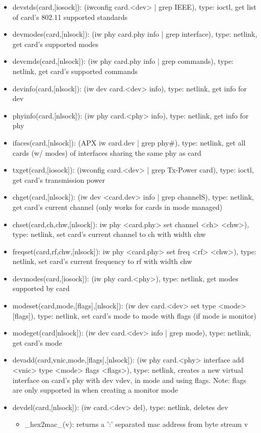 \documentclass[11pt]{article}
\begin{document}
\begin{appendices}
\begin{itemize}
\item devstds(card,[iosock]): (iwconfig card.<dev> | grep IEEE), type: ioctl, get
list of card's 802.11 supported standards
\item devmodes(card,[nlsock]): (iw phy card.phy info | grep interface), type:
netlink, get card's supported modes
\item devcmds(card,[nlsock]): (iw phy card.phy info | grep commands), type:
netlink, get card's supported commands
\item devinfo(card,[nlsock]): (iw dev card.<dev> info), type: netlink, get info 
for dev 
\item phyinfo(card,[nlsock]): (iw phy card.<phy> info), type: netlink, get info
for phy
\item ifaces(card,[nlsock]): (APX iw card.dev | grep phy\#), type: netlink, get all
cards (w/ modes) of interfaces sharing the same phy as card
\item txget(card,[iosock]): (iwconfig card.<dev> | grep Tx-Power card), type: 
ioctl, get card's transmission power
\item chget(card,[nlsock]): (iw dev <card.dev> info | grep channelS), type: 
netlink, get card's current channel (only works for cards in mode managed)
\item chset(card,ch,chw,[nlsock]): iw phy <card.phy> set channel <ch> <chw>), 
type: netlink, set card's current channel to ch with width chw
\item freqset(card,rf,chw,[nlsock]): iw phy <card.phy> set freq <rf> <chw>), 
type: netlink, set card's current frequency to rf with width chw
\item devmodes(card,[iosock]): (iw phy card.<phy>), type: netlink, get modes 
supported by card
\item modeset(card,mode,[flags],[nlsock]): (iw dev card.<dev> set type <mode> 
[flags]), type: netlink, set card's mode to mode with flags (if mode is monitor)
\item modeget(card[nlsock]): (iw dev card.<dev> info | grep mode), type: netlink,
get card's mode
\item devadd(card,vnic,mode,[flags],[nlsock]): (iw phy card.<phy> interface add
<vnic> type <mode> flags <flags>), type: netlink, creates a new virtual interface
on card's phy with dev vdev, in mode and using flags. Note: flags are only supported
in when creating a monitor mode
\item devdel(card,[nlsock]): (iw card.<dev> del), type: netlink, deletes dev
\begin{itemize}
\item \_hex2mac\_(v): returns a ':' separated mac address from byte stream v

\end{itemize}
\end{itemize}
\end{appendices}
\end{document}
